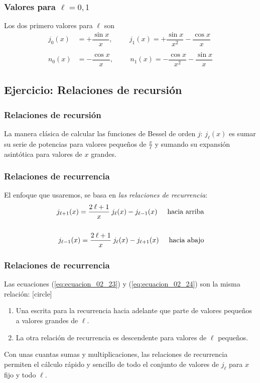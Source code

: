 \begin{frame}
\frametitle{Valores para $\ell = 0, 1$}
Los dos primero valores para $\ell$ son
\begin{align}
j_{0} (x) &= + \dfrac{\sin x}{x}, \hspace{1cm} j_{1} (x) = +\dfrac{\sin x}{x^{2}} - \dfrac{\cos x}{x} \label{eq:ecuacion_02_21} \\
&{} \nonumber \\
n_{0} (x) &= - \dfrac{\cos x}{x}, \hspace{1cm} n_{1} (x) = -\dfrac{\cos x}{x^{2}} - \dfrac{\sin x}{x} \label{eq:ecuacion_02_22}
\end{align}
\end{frame}
\subsection{Ejercicio: Relaciones de recursión}
\begin{frame}
\frametitle{Relaciones de recursión}
La manera clásica de calcular las funciones de Bessel de orden $j$: $j_{\ell} (x)$ es sumar su serie de potencias para valores pequeños de $\frac{x}{\ell}$ y sumando su expansión asintótica para valores de $x$ grandes.
\end{frame}
\begin{frame}
\frametitle{Relaciones de recurrencia}
El enfoque que usaremos, se basa en \emph{las relaciones de recurrencia}:
\begin{align}
j_{\ell + 1} (x) = \dfrac{2 \: \ell + 1}{x} \: j_{\ell}(x) - j_{\ell - 1}(x) \hspace{0.5cm} \mbox{hacia arriba} \label{eq:ecuacion_02_23}  \\
{} \nonumber \\ 
j_{\ell - 1} (x) = \dfrac{2 \: \ell + 1}{x} \: j_{\ell}(x) - j_{\ell + 1}(x) \hspace{0.5cm} \mbox{hacia abajo} \label{eq:ecuacion_02_24}
\end{align}
\end{frame}
\begin{frame}
\frametitle{Relaciones de recurrencia}
Las ecuaciones (\ref{eq:ecuacion_02_23}) y (\ref{eq:ecuacion_02_24}) son la misma relación:
[circle]
\begin{enumerate}[<+->]
\item Una escrita para la recurrencia hacia adelante que parte de valores pequeños a valores grandes de $\ell$.
\item La otra relación de recurrencia es descendente para valores de $\ell$ pequeños.
\end{enumerate}
\pause
 Con unas cuantas sumas y multiplicaciones, las relaciones de recurrencia permiten el cálculo rápido y sencillo de todo el conjunto de valores de $j_{\ell}$ para $x$ fijo y todo $\ell$.
\end{frame}
